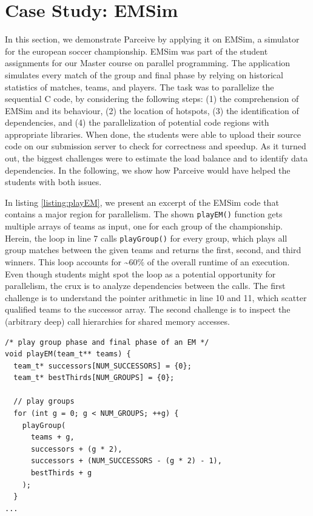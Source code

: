 \section{Case Study: EMSim}
\label{sec:case_study}
In this section, we demonstrate Parceive by applying it on EMSim, a simulator
for the european soccer championship. EMSim was part of the student assignments
for our Master course on parallel programming. The application simulates every
match of the group and final phase by relying on historical statistics of
matches, teams, and players. The task was to parallelize the sequential
C code, by considering the following steps: (1) the comprehension of EMSim and
its behaviour, (2) the location of hotspots, (3) the identification of
dependencies, and (4) the parallelization of potential code regions with
appropriate libraries. When done, the students were able to upload their source
code on our submission server to check for correctness and speedup. As it
turned out, the biggest challenges were to estimate the load balance and to
identify data dependencies. In the following, we show how Parceive would have
helped the students with both issues.

In listing \ref{listing:playEM}, we present an excerpt of the EMSim code that
contains a major region for parallelism. The shown \texttt{playEM()} function
gets multiple arrays of teams as input, one for each group of the championship.
Herein, the loop in line 7 calls \texttt{playGroup()} for every group, which
plays all group matches between the given teams and returns the first, second,
and third winners. This loop accounts for \textasciitilde60\% of the overall
runtime of an execution. Even though students might spot the loop as a
potential opportunity for parallelism, the crux is to analyze dependencies
between the calls. The first challenge is to understand the pointer arithmetic
in line 10 and 11, which scatter qualified teams to the successor array. The
second challenge is to inspect the (arbitrary deep) call hierarchies for shared
memory accesses.

\begin{lstlisting}[caption=A major region for loop-parallelism in the
EMSim code, label=listing:playEM]
/* play group phase and final phase of an EM */
void playEM(team_t** teams) {
  team_t* successors[NUM_SUCCESSORS] = {0};
  team_t* bestThirds[NUM_GROUPS] = {0};

  // play groups
  for (int g = 0; g < NUM_GROUPS; ++g) {
    playGroup(
      teams + g,
      successors + (g * 2),
      successors + (NUM_SUCCESSORS - (g * 2) - 1),
      bestThirds + g
    );
  }
...
\end{lstlisting}

